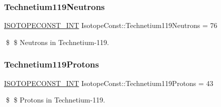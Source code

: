 \subsubsection{\texorpdfstring{Technetium119\+Neutrons}{Technetium119Neutrons}}
{\footnotesize\ttfamily \mbox{\hyperlink{group___isotope_const-_macros_ga5f18360b3e99483a35c32d789e62621c}{I\+S\+O\+T\+O\+P\+E\+C\+O\+N\+S\+T\+\_\+\+I\+NT}} Isotope\+Const\+::\+Technetium119\+Neutrons = 76}

\$ \$ Neutrons in Technetium-\/119. \mbox{\label{group___isotope_const-_technetium-_tc119_ga4b907bf90b82d82190f243f1c97b4d1a}} 
\subsubsection{\texorpdfstring{Technetium119\+Protons}{Technetium119Protons}}
{\footnotesize\ttfamily \mbox{\hyperlink{group___isotope_const-_macros_ga5f18360b3e99483a35c32d789e62621c}{I\+S\+O\+T\+O\+P\+E\+C\+O\+N\+S\+T\+\_\+\+I\+NT}} Isotope\+Const\+::\+Technetium119\+Protons = 43}

\$ \$ Protons in Technetium-\/119. 
